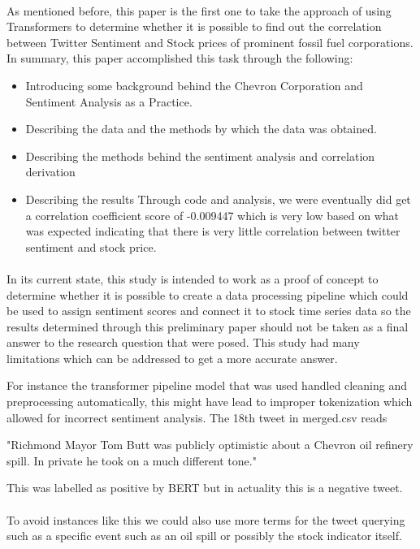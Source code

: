 \documentclass[12pt, letterpaper, titlepage]{article}
\begin{document}
\paragraph{}
	As mentioned before, this paper is the first one to take the approach of using Transformers to determine whether it is possible to find out the correlation between Twitter Sentiment and Stock prices of prominent fossil fuel corporations. In summary, this paper accomplished this task through the following:
\begin{itemize}
    \item Introducing some background behind the Chevron Corporation and Sentiment Analysis as a Practice.
    \item Describing the data and the methods by which the data was obtained.
    \item Describing the methods behind the sentiment analysis and correlation derivation
    \item Describing the results
    Through code and analysis, we were eventually did get a correlation coefficient score of -0.009447 which is very low based on what was expected indicating that there is very little correlation between twitter sentiment and stock price.

\end{itemize}
\paragraph{}
	In its current state, this study is intended to work as a proof of concept to determine whether it is possible to create a data processing pipeline which could be used to assign sentiment scores and connect it to stock time series data so the results determined through this preliminary paper should not be taken as a final answer to the research question that were posed. This study had many limitations which can be addressed to get a more accurate answer. 

	For instance the transformer pipeline model that was used handled cleaning and preprocessing automatically, this might have lead to improper tokenization which allowed for incorrect sentiment analysis. The 18th tweet in merged.csv reads 
	
	"Richmond Mayor Tom Butt was publicly optimistic about a Chevron oil refinery spill. In private he took on a much different tone." 
	
	This was labelled as positive by BERT but in actuality this is a negative tweet.
\paragraph{}
	To avoid instances like this we could also use more terms for the tweet querying such as a specific event such as an oil spill or possibly the stock indicator itself. 
\end{document}
